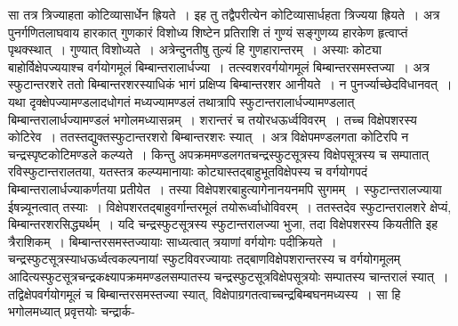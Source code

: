 \documentclass[11pt, openany]{book}
\begin{document}
\noindent सा तत्र त्रिज्याहता कोटिव्यासार्धेन ह्रियते~। इह तु तद्वैपरीत्येन कोटिव्यासार्धहता त्रिज्यया ह्रियते~। अत्र पुनर्गणितलाघवाय हारकात् गुणकारं विशोध्य शिष्टेन प्रतिराशि तं गुण्यं सङ्गुणय्य हारकेण हृत्वाप्तं पृथक्स्थात्~। गुण्यात् विशोध्यते~। अत्रेन्दुनतीषु तुल्यं हि गुणहारान्तरम्~। अस्याः कोट्या बाहोर्विक्षेपज्ययाश्च वर्गयोगमूलं बिम्बान्तरालार्धज्या~। तत्स्वशरवर्गयोगमूलं बिम्बान्तरसमस्तज्या~। अत्र
स्फुटान्तरशरे ततो बिम्बान्तरशरस्याधिकं भागं प्रक्षिप्य बिम्बान्तरशर आनीयते~। न पुनर्ज्याच्छेदविधानवत्~। यथा दृक्क्षेपज्यामण्डलादधोगतं
मध्यज्यामण्डलं तथात्रापि स्फुटान्तरालार्धज्यामण्डलात् बिम्बान्तरालार्धज्यामण्डलं भगोलमध्यासन्नम्~। शरान्तरं च तयोरधऊर्ध्वविवरम्~। तच्च
विक्षेपशरस्य कोटिरेव~। ततस्तद्युक्तस्फुटान्तरशरो बिम्बान्तरशरः स्यात्~। अत्र विक्षेपमण्डलगता कोटिरपि न चन्द्रस्पृष्टकोटिमण्डले कल्प्यते~।
किन्तु अपक्रममण्डलगतचन्द्रस्फुटसूत्रस्य विक्षेपसूत्रस्य च सम्पातात् रविस्फुटान्तरालतया, यतस्तत्र कल्प्यमानायाः कोट्यास्तद्बाहुभूतविक्षेपस्य
च वर्गयोगपदं बिम्बान्तरालार्धज्याकर्णतया प्रतीयेत~। तस्या विक्षेपशरबाहुत्यागेनानयनमपि सुगमम्~। स्फुटान्तरालज्याया ईषन्न्यूनत्वात्
तस्याः~। विक्षेपशरतद्बाहुवर्गान्तरमूलं तयोरूर्ध्वाधोविवरम्~। ततस्तदेव स्फुटान्तरालशरे क्षेप्यं, बिम्बान्तरशरसिद्ध्यर्थम्~। यदि चन्द्रस्फुटसूत्रस्य स्फुटान्तरालज्या भुजा, तदा विक्षेपशरस्य कियतीति इह त्रैराशिकम्~। बिम्बान्तरसमस्तज्यायाः साध्यत्वात् त्रयाणां वर्गयोगः पदीक्रियते~। चन्द्रस्फुटसूत्रस्याधऊर्ध्वत्वकल्पनायां स्फुटविवरज्यायाः तद्बाणविक्षेपशरान्तरस्य च वर्गयोगमूलम् आदित्यस्फुटसूत्रचन्द्रकक्ष्यापक्रममण्डलसम्पातस्य चन्द्रस्फुटसूत्रविक्षेपसूत्रयोः सम्पातस्य चान्तरालं स्यात्~। तद्विक्षेपवर्गयोगमूलं च बिम्बान्तरसमस्तज्या स्यात्, विक्षेपाग्रगतत्वाच्चन्द्रबिम्बघनमध्यस्य~। सा हि भगोलमध्यात् प्रवृत्तयोः चन्द्रार्क-

\newpage
\end{document}
